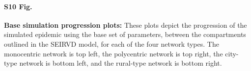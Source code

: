 \documentclass[10pt,letterpaper]{article}
\begin{document}
\paragraph*{S10 Fig.}
\label{SI:progression_plots}
{\bf Base simulation progression plots:}
These plots depict the progression of the simulated epidemic using the base set of parameters, between the compartments outlined in the SEIRVD model, for each of the four network types. The monocentric network is top left, the polycentric network is top right, the city-type network is bottom left, and the rural-type network is bottom right.

\begin{figure}[ht!]
\end{figure}
\end{document}
